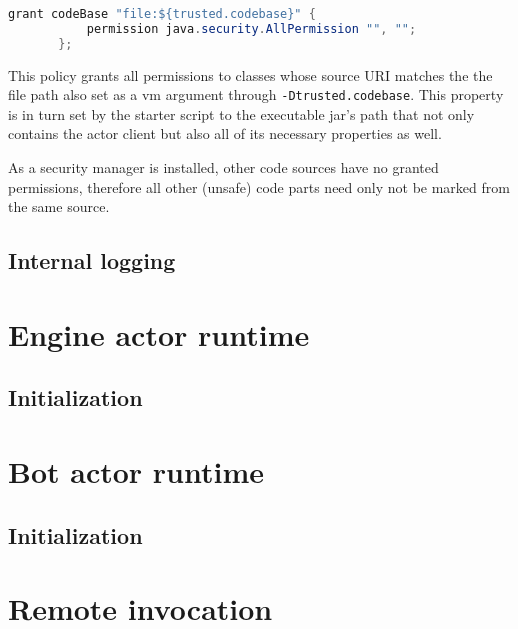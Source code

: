 \documentclass[11pt,a4paper,oneside]{report}
\newcommand{\code}{\texttt}
\begin{document}
			\begin{center}
				\begin{minipage}{11cm}
					\begin{lstlisting}[language=Java, title={\code{client.policy}}]
	   grant codeBase "file:${trusted.codebase}" {
		   permission java.security.AllPermission "", "";
	   };
					\end{lstlisting}
				\end{minipage}
			\end{center}
		
			This policy grants all permissions to classes whose source URI matches the the file path also set as a vm argument through \code{-Dtrusted.codebase}. This property is in turn set by the starter script to the executable jar's path that not only contains the actor client but also all of its necessary properties as well.
			
			As a security manager is installed, other code sources have no granted permissions, therefore all other (unsafe) code parts need only not be marked from the same source.
			
		\subsection{Internal logging}
		
	\section{Engine actor runtime}

		\subsection{Initialization}

	\section{Bot actor runtime}
	
		\subsection{Initialization}

	\section{Remote invocation}
\end{document}
